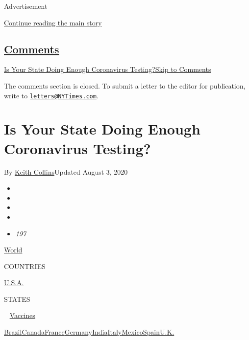 Advertisement

\protect\hyperlink{after-top}{Continue reading the main story}

\hypertarget{comments}{%
\subsection{\texorpdfstring{\protect\hyperlink{commentsContainer}{Comments}}{Comments}}\label{comments}}

\href{}{Is Your State Doing Enough Coronavirus Testing?}\href{}{Skip to
Comments}

The comments section is closed. To submit a letter to the editor for
publication, write to
\href{mailto:letters@NYTimes.com}{\nolinkurl{letters@NYTimes.com}}.

\hypertarget{is-your-state-doing-enough-coronavirus-testing}{%
\section{Is Your State Doing Enough Coronavirus
Testing?}\label{is-your-state-doing-enough-coronavirus-testing}}

By \href{https://www.nytimes3xbfgragh.onion/by/keith-collins}{Keith
Collins}Updated August 3, 2020

\begin{itemize}
\item
\item
\item
\item
\item
  \emph{197}
\end{itemize}

\href{https://www.nytimes3xbfgragh.onion/interactive/2020/world/coronavirus-maps.html}{World}~

COUNTRIES

\textbar{}
\href{https://www.nytimes3xbfgragh.onion/interactive/2020/us/coronavirus-us-cases.html}{U.S.A.}~

STATES

~
\href{https://www.nytimes3xbfgragh.onion/interactive/2020/science/coronavirus-vaccine-tracker.html}{Vaccines}

\href{https://www.nytimes3xbfgragh.onion/interactive/2020/world/americas/brazil-coronavirus-cases.html}{Brazil}\href{https://www.nytimes3xbfgragh.onion/interactive/2020/world/canada/canada-coronavirus-cases.html}{Canada}\href{https://www.nytimes3xbfgragh.onion/interactive/2020/world/europe/france-coronavirus-cases.html}{France}\href{https://www.nytimes3xbfgragh.onion/interactive/2020/world/europe/germany-coronavirus-cases.html}{Germany}\href{https://www.nytimes3xbfgragh.onion/interactive/2020/world/asia/india-coronavirus-cases.html}{India}\href{https://www.nytimes3xbfgragh.onion/interactive/2020/world/europe/italy-coronavirus-cases.html}{Italy}\href{https://www.nytimes3xbfgragh.onion/interactive/2020/world/americas/mexico-coronavirus-cases.html}{Mexico}\href{https://www.nytimes3xbfgragh.onion/interactive/2020/world/europe/spain-coronavirus-cases.html}{Spain}\href{https://www.nytimes3xbfgragh.onion/interactive/2020/world/europe/united-kingdom-coronavirus-cases.html}{U.K.}

